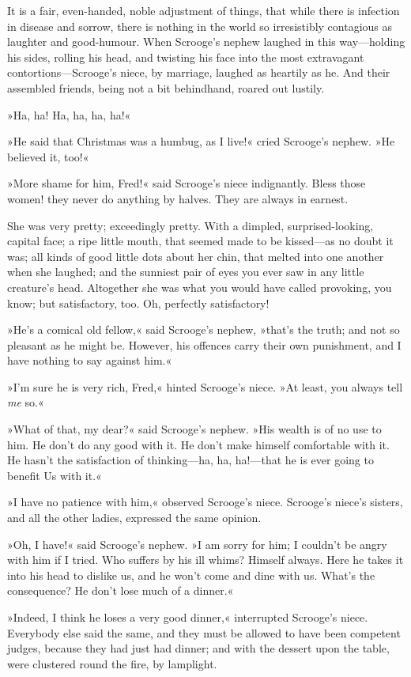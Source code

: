 It is a fair, even-handed, noble adjustment of things, that while there is infection in disease and sorrow, there is nothing in the world so irresistibly contagious as laughter and good-humour.  When Scrooge's nephew laughed in this way—holding his sides, rolling his head, and twisting his face into the most extravagant  contortions—Scrooge's niece, by marriage, laughed as heartily as he. And their assembled friends, being not a bit behindhand, roared out lustily.

»Ha, ha! Ha, ha, ha, ha!«

»He said that Christmas was a humbug, as I live!« cried Scrooge's nephew. »He believed it, too!«

»More shame for him, Fred!« said Scrooge's niece indignantly. Bless those women! they never do anything by halves. They are always in earnest.

She was very pretty; exceedingly pretty. With a dimpled,  surprised-looking, capital face; a ripe little mouth, that seemed made to be kissed—as no doubt it was; all kinds of good little dots about her chin, that melted into one another when she laughed; and the sunniest pair of eyes you ever saw in any little creature's head. Altogether she was what you would have called provoking, you know; but satisfactory, too. Oh, perfectly satisfactory!

»He's a comical old fellow,« said Scrooge's nephew, »that's the truth; and not so pleasant as he might be. However, his offences carry their own punishment, and I have nothing to say against him.«

»I'm sure he is very rich, Fred,« hinted Scrooge's niece. »At least, you always tell \textit{me} so.«

»What of that, my dear?« said Scrooge's nephew. »His wealth is of no use to him. He don't do any good with it. He don't make himself comfortable with it. He hasn't the satisfaction of thinking—ha, ha, ha!—that he is ever going to benefit Us with it.«

»I have no patience with him,« observed Scrooge's niece.  Scrooge's niece's sisters, and all the other ladies, expressed the same opinion.

»Oh, I have!« said Scrooge's nephew. »I am sorry for him; I couldn't be angry with him if I tried. Who suffers by his ill whims? Himself always. Here he takes it into his head to dislike us, and he won't come and dine with us. What's the consequence? He don't lose much of a dinner.«

»Indeed, I think he loses a very good dinner,« interrupted  Scrooge's niece. Everybody else said the same, and they must be allowed to have been competent judges, because they had just had dinner; and with the dessert upon the table, were clustered round the fire, by lamplight.


